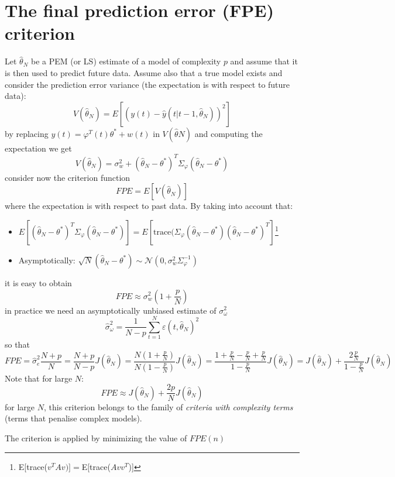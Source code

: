 \documentclass{book}
\theoremstyle{definition}
\theoremstyle{remark}
\theoremstyle{remark}
\begin{document}
\section{The final prediction error (FPE) criterion}
Let $\hat{\theta}_N$ be a PEM (or LS) estimate of a model of complexity $p$ and assume that it is then used to predict future data. Assume also that a true model exists and consider the prediction error variance (the expectation is with respect to future data):
\[
    V(\hat{\theta}_N) = E \left[ \left(y(t)-\hat{y}(t|t-1,\hat{\theta}_N)\right)^2   \right]
\]
by replacing $y(t)=\varphi^T(t)\theta^*+w(t)$ in $V(\hat{\theta}N)$ and computing the expectation we get
\[
    V(\hat{\theta}_N) = \sigma_w^2 + (\hat{\theta}_N-\theta^*)^T\Sigma_\varphi(\hat{\theta}_N-\theta^*)
\]
consider now the criterion function
\[
    FPE = E\left[V(\hat{\theta}_N)\right]
\]
where the expectation is with respect to past data. By taking into account that:
\begin{itemize}
    \item \(
            E[(\hat{\theta}_N-\theta^*)^T\Sigma_{\varphi}(\hat{\theta}_N-\theta^*)]=E[\text{trace}(\Sigma_\varphi(\hat{\theta}_N-\theta^*)(\hat{\theta}_N-\theta^*)^T]
        \)\footnote{E[trace($v^TAv)]=$E[trace($Avv^T$)]}
\item Asymptotically: $\sqrt{N}(\hat{\theta}_N-\theta^*)\sim\mathcal{N}(0,\sigma^2_w\Sigma_\varphi^{-1})$
\end{itemize}
it is easy to obtain
\[
    FPE\approx \sigma_w^2\left( 1+\displaystyle\frac{p}{N}\right)
\]
in practice we need an asymptotically unbiased estimate of $\sigma_\omega^2$ 
\[
    \hat{\sigma}_\omega^2 = \displaystyle\frac{1}{N-p}\displaystyle\sum_{t=1}^{N}\varepsilon(t,\hat{\theta}_N)^2 
\]
so that
\[
    FPE=\hat{\sigma}_e^2 \displaystyle\frac{N+p}{N}=\displaystyle\frac{N+p}{N-p}J(\hat{\theta}_N)=\displaystyle\frac{N\left(1+\displaystyle\frac{p}{N}\right)}{N\left(1-\displaystyle\frac{p}{N}\right)}J(\hat{\theta}_N)=\displaystyle\frac{1+\displaystyle\frac{p}{N}-\displaystyle\frac{p}{N}+\displaystyle\frac{p}{N}}{1-\displaystyle\frac{p}{N}} J(\hat{\theta}_N)=J(\hat{\theta}_N)+\displaystyle\frac{2\displaystyle\frac{p}{N}}{1-\displaystyle\frac{p}{N}}J(\hat{\theta}_N)
\]
Note that for large $N$:
\[
    FPE\approx J(\hat{\theta}_N)+\displaystyle\frac{2p}{N}J(\hat{\theta}_N)
\]
for large $N$, this criterion belongs to the family of \emph{criteria with complexity terms} (terms that penalise complex models).

The criterion is applied by minimizing the value of $FPE(n)$
\end{document}
